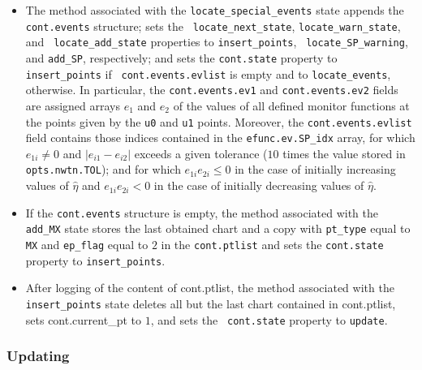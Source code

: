 \documentclass{article}
\begin{document}
\begin{itemize}
\item The method associated with the \texttt{locate\_special\_events} state
appends the \texttt{cont.events} structure; sets the \texttt{%
locate\_next\_state}, \texttt{locate\_warn\_state}, and \texttt{%
locate\_add\_state} properties to \texttt{insert\_points}, \texttt{%
locate\_SP\_warning}, and \texttt{add\_SP}, respectively; and sets the 
\texttt{cont.state} property to \texttt{insert\_points} if \texttt{%
cont.events.evlist} is empty and to \texttt{locate\_events}, otherwise. In
particular, the \texttt{cont.events.ev1} and \texttt{cont.events.ev2} fields
are assigned arrays $e_{1}$ and $e_{2}$ of the values of all defined monitor
functions at the points given by the \texttt{u0} and \texttt{u1} points.
Moreover, the \texttt{cont.events.evlist} field contains those indices
contained in the \texttt{efunc.ev.SP\_idx} array, for which $e_{1i}\neq 0$
and $\left| e_{i1}-e_{i2}\right| $ exceeds a given tolerance ($10$ times the
value stored in \texttt{opts.nwtn.TOL}); and for which $e_{1i}e_{2i}\leq 0$
in the case of initially increasing values of $\hat{\eta}$ and $%
e_{1i}e_{2i}<0$ in the case of initially decreasing values of $\hat{\eta}$.

\item If the \texttt{cont.events} structure is empty, the method associated
with the \texttt{add\_MX} state stores the last obtained chart and a copy
with \texttt{pt\_type} equal to \texttt{MX} and \texttt{ep\_flag} equal to $%
2 $ in the \texttt{cont.ptlist} and sets the \texttt{cont.state} property to 
\texttt{insert\_points}.

\item After logging of the content of cont.ptlist, the method associated
with the \texttt{insert\_points} state deletes all but the last chart
contained in cont.ptlist, sets cont.current\_pt to $1$, and sets the \texttt{%
cont.state} property to \texttt{update}.
\end{itemize}

\subsubsection{Updating}
\end{document}
